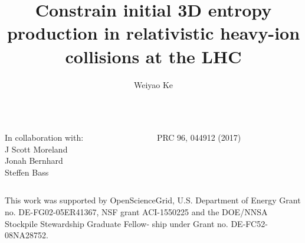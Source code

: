 \documentclass[11pt]{beamer}
\author[Weiyao Ke]{Weiyao Ke}
\title[3D initial entropy production]{Constrain initial 3D entropy production in relativistic heavy-ion collisions at the LHC}
\institute[Duke Univ.]{\small \it Duke University}
\begin{document}
\begin{frame}
\titlepage
\begin{columns}
\begin{column}{0.6\textwidth}
In collaboration with:\\
\quad\quad J Scott Moreland\\
\quad\quad\hspace*{0.08cm} Jonah Bernhard \\
\quad\hspace*{0.31cm} Steffen Bass
\end{column}
\begin{column}{0.4\textwidth}
\small PRC 96, 044912 (2017)
\end{column}
\end{columns}
\vspace{0.5cm}
\color{gray} \tiny This work was supported by OpenScienceGrid, U.S. Department of Energy Grant no. DE-FG02-05ER41367, NSF grant ACI-1550225 and the DOE/NNSA Stockpile Stewardship Graduate Fellow- ship under Grant no. DE-FC52-08NA28752.
\end{frame}
\end{document}
